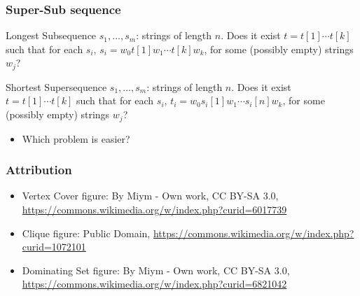 \documentclass[12pt,aspectratio=169]{beamer}
\begin{document}
  \begin{frame}\frametitle{Super-Sub sequence }
    \begin{block}{Longest Subsequence}
      $s_{1}, \ldots, s_{m}$: strings of length $n$.
%
      Does it exist $t=t[1]\cdots t[k]$ such that for  each $s_{i}$, $s_{i} = w_{0} t[1] w_{1} \cdots
      t[k]w_{k}$, for some (possibly empty) strings $w_{j}$?
    \end{block}
    \begin{block}{Shortest Supersequence}
      $s_{1}, \ldots, s_{m}$: strings of length $n$.
%
      Does it exist $t=t[1]\cdots t[k]$ such that for  each $s_{i}$, $t_{i} = w_{0} s_{i}[1] w_{1} \cdots
      s_{i}[n]w_{k}$, for some (possibly empty) strings $w_{j}$?
    \end{block}

    \begin{itemize}
    \item
      Which problem is easier?
    \end{itemize}
  \end{frame} 

\begin{frame}\frametitle{Attribution}
\small
  \begin{itemize}[<.->]
  \item
    Vertex Cover figure: By Miym - Own work, CC BY-SA 3.0,
    \url{https://commons.wikimedia.org/w/index.php?curid=6017739}
  \item
    Clique figure: Public Domain,
    \url{https://commons.wikimedia.org/w/index.php?curid=1072101}
  \item
    Dominating Set figure: By Miym - Own work, CC BY-SA 3.0, \url{https://commons.wikimedia.org/w/index.php?curid=6821042}
  \end{itemize}
\end{frame}
\end{document}
